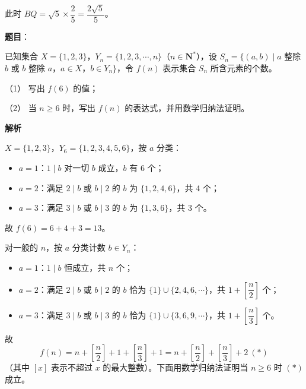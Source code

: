 \begin{answer}
此时 \(BQ=\sqrt{5}\times\dfrac{2}{5}=\dfrac{2\sqrt{5}}{5}\)。



\end{answer}
\begin{answer}

\textbf{题目}：

已知集合 \(X=\{1,2,3\}\)，\(Y_{n}=\{1,2,3,\cdots,n\}\)（\(n\in\mathbf{N}^{*}\)），设 \(S_{n}=\{(a,b)\mid a\) 整除 \(b\) 或 \(b\) 整除 \(a\)，\(a\in X\)，\(b\in Y_{n}\}\)，令 \(f(n)\) 表示集合 \(S_{n}\) 所含元素的个数。

（1） 写出 \(f(6)\) 的值；

（2） 当 \(n\geqslant 6\) 时，写出 \(f(n)\) 的表达式，并用数学归纳法证明。

\textbf{解析}


\(X=\{1,2,3\}\)，\(Y_{6}=\{1,2,3,4,5,6\}\)，按 \(a\) 分类：

\begin{itemize}
\item \(a=1\)：\(1\mid b\) 对一切 \(b\) 成立，\(b\) 有 6 个；
\item \(a=2\)：满足 \(2\mid b\) 或 \(b\mid2\) 的 \(b\) 为 \(\{1,2,4,6\}\)，共 4 个；
\item \(a=3\)：满足 \(3\mid b\) 或 \(b\mid3\) 的 \(b\) 为 \(\{1,3,6\}\)，共 3 个。
\end{itemize}

故 \(f(6)=6+4+3=13\)。


对一般的 \(n\)，按 \(a\) 分类计数 \(b\in Y_{n}\)：

\begin{itemize}
\item \(a=1\)：\(1\mid b\) 恒成立，共 \(n\) 个；
\item \(a=2\)：满足 \(2\mid b\) 或 \(b\mid2\) 的 \(b\) 恰为 \(\{1\}\cup\{2,4,6,\cdots\}\)，共 \(1+\left[\dfrac{n}{2}\right]\) 个；
\item \(a=3\)：满足 \(3\mid b\) 或 \(b\mid3\) 的 \(b\) 恰为 \(\{1\}\cup\{3,6,9,\cdots\}\)，共 \(1+\left[\dfrac{n}{3}\right]\) 个。
\end{itemize}

故
\nopagebreak[4]
\[
f(n)=n+\left[\frac{n}{2}\right]+1+\left[\frac{n}{3}\right]+1=n+\left[\frac{n}{2}\right]+\left[\frac{n}{3}\right]+2\ (*)
\]
（其中 \([x]\) 表示不超过 \(x\) 的最大整数）。下面用数学归纳法证明当 \(n\geqslant6\) 时 \((*)\) 成立。


\end{answer}
